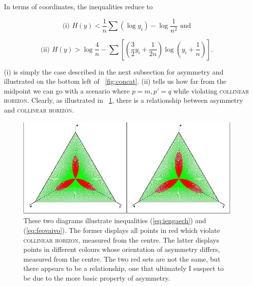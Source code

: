 \documentclass[phd,12pt,oneside]{ubcthesis}
\begin{document}
{\noindent}In terms of coordinates, the inequalities reduce to

\begin{equation}
  \label{eq:iengaech}
\mbox{(i) }H(y)<\frac{1}{n}\sum\left(\log{}y_{i}\right)-\log\frac{1}{n^{2}}\mbox{ and}
\end{equation}

\begin{equation}
  \label{eq:feovaivo}
\mbox{(ii) }H(y)>\log\frac{4}{n}-\sum\left[\left(\frac{3}{2}y_{i}+\frac{1}{2n}\right)\log\left(y_{i}+\frac{1}{n}\right)\right].
\end{equation}

{\noindent}(i) is simply the case described in the next subsection for asymmetry
and illustrated on the bottom left of {\igure}~\ref{fig:concat}. (ii)
tells us how far from the midpoint we can go with a scenario where
$p=m,p'=q$ while violating \textsc{collinear horizon}. Clearly, as
illustrated in {\igure}~\ref{fig:eeghoomo}, there is a relationship
between asymmetry and \textsc{collinear horizon}. 

\begin{figure}[ht!]
    \begin{minipage}[h]{\linewidth}
      \includegraphics[width=\textwidth]{fleur-concat.png}
      \caption{\footnotesize These two diagrams illustrate
        inequalities (\ref{eq:iengaech}) and (\ref{eq:feovaivo}). The
        former displays all points in red which violate
        \textsc{collinear horizon}, measured from the centre. The
        latter displays points in different colours whose orientation
        of asymmetry differs, measured from the centre. The two red
        sets are not the same, but there appears to be a relationship,
        one that ultimately I suspect to be due to the more basic
        property of asymmetry.}
      \label{fig:eeghoomo}
    \end{minipage}
\end{figure}
\end{document}
